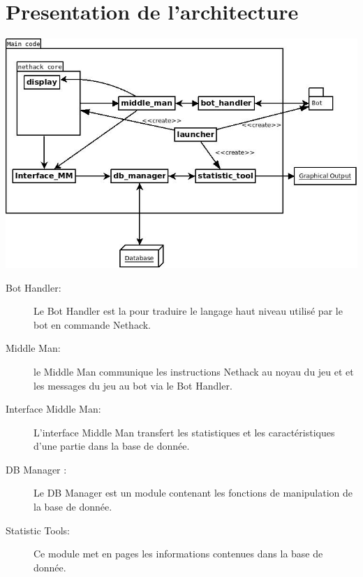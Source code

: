 \chapter{Presentation de l'architecture}

\includegraphics[width=140mm]{Images/new_archi.jpeg}

\begin{description}
\item[Bot Handler: ] Le Bot Handler est la pour traduire le langage haut niveau utilisé par le bot en commande Nethack.
\item[Middle Man: ] le Middle Man communique les instructions Nethack au noyau du jeu et et les messages du jeu au bot via le Bot Handler.
\item[Interface Middle Man: ] L'interface Middle Man transfert les statistiques et les caractéristiques d'une partie dans la base de donnée.
\item[DB Manager :] Le DB Manager est un module contenant les fonctions de manipulation de la base de donnée.
\item[Statistic Tools:] Ce module met en pages les informations contenues dans la base de donnée.  
\end{description}
